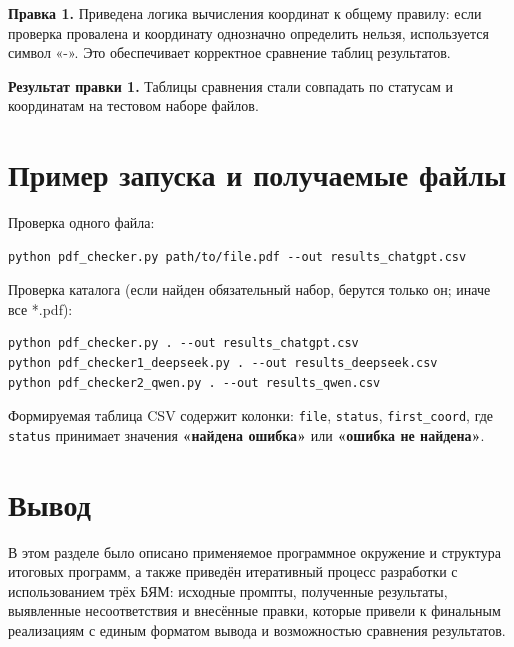 \textbf{Правка 1.} Приведена логика вычисления координат к общему правилу:
если проверка провалена и координату однозначно определить нельзя, используется символ «-».
Это обеспечивает корректное сравнение таблиц результатов.

\textbf{Результат правки 1.} Таблицы сравнения стали совпадать по статусам и координатам
на тестовом наборе файлов.

\section{Пример запуска и получаемые файлы}

Проверка одного файла:
\begin{verbatim}
python pdf_checker.py path/to/file.pdf --out results_chatgpt.csv
\end{verbatim}

Проверка каталога (если найден обязательный набор, берутся только он; иначе все *.pdf):
\begin{verbatim}
python pdf_checker.py . --out results_chatgpt.csv
python pdf_checker1_deepseek.py . --out results_deepseek.csv
python pdf_checker2_qwen.py . --out results_qwen.csv
\end{verbatim}

Формируемая таблица CSV содержит колонки: \texttt{file}, \texttt{status}, \texttt{first\_coord},
где \texttt{status} принимает значения \textbf{«найдена ошибка»} или \textbf{«ошибка не найдена»}.

\section{Вывод}

В этом разделе было описано применяемое программное окружение и структура итоговых программ,
а также приведён итеративный процесс разработки с использованием трёх БЯМ:
исходные промпты, полученные результаты, выявленные несоответствия и внесённые правки,
которые привели к финальным реализациям с единым форматом вывода и возможностью сравнения результатов.
